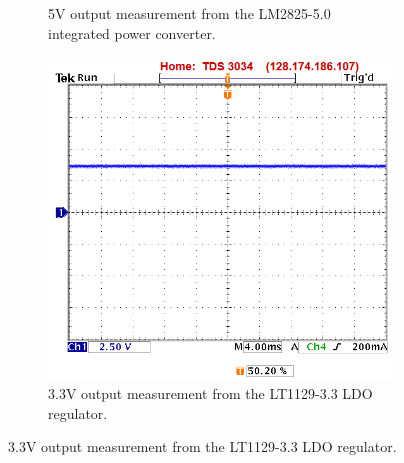 \begin{figure}
\begin{figure}
\caption{5V output measurement from the LM2825-5.0 integrated power converter.}
\label{fig:main_5v_output}
\end{figure}
\begin{figure}
\centering
\includegraphics[width=.8\textwidth]{main_3_3v_output.png}
\caption{3.3V output measurement from the LT1129-3.3 LDO regulator.}
\label{fig:main_3_3v_output}
\end{figure}


\end{figure}
